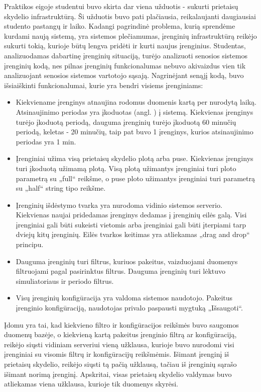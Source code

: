 \documentclass{VUMIFPSbakalaurinis}
\begin{document}
Praktikos eigoje studentui buvo skirta dar viena užduotis - sukurti prietaisų skydelio infrastruktūrą. Ši užduotis buvo pati plačiausia, reikalaujanti daugiausiai studento pastangų ir laiko. Kadangi pagrindinė problema, kurią sprendėme kurdami naują sistemą, yra sistemos plečiamumas, įrenginių infrastruktūrą reikėjo sukurti tokią, kurioje būtų lengva pridėti ir kurti naujus įrenginius. Studentas, analizuodamas dabartinę įrenginių situaciją, turėjo analizuoti senosios sistemos įrenginių kodą, nes pilnas įrenginių funkcionalumas nebuvo akivaizdus vien tik analizuojant senosios sistemos vartotojo sąsają. Nagrinėjant senąjį kodą, buvo išsiaiškinti funkcionalumai, kurie yra bendri visiems įrenginiams:
\begin{itemize}
    \item Kiekviename įrenginys atnaujina rodomus duomenis kartą per nurodytą laiką. Atsinaujinimo periodas yra įkoduotas (angl. ) į sistemą. Kiekvienas įrenginys turėjo įkoduotą periodą, dauguma įrenginių turėjo įkoduotą 60 minučių periodą, keletas - 20 minučių, taip pat buvo 1 įrenginys, kurios atsinaujinimo periodas yra 1 min.
    \item Įrenginiai užima visą prietaisų skydelio plotą arba puse. Kiekvienas įrenginys turi įkoduotą užimamą plotą. Visą plotą užimantys įrenginiai turi ploto parametrą su „full“ reikšme, o puse ploto užimantys įrenginiai turi parametrą su „half“ string tipo reikšme.
    \item Įrenginių išdėstymo tvarka yra nurodoma vidinio sistemos serverio. Kiekvienas naujai pridedamas įrenginys dedamas į įrenginių eilės galą. Visi įrenginiai gali būti sukeisti vietomis arba įrenginiai gali būti įterpiami tarp dviejų kitų įrenginių. Eilės tvarkos keitimas yra atliekamas „drag and drop“ principu.
    \item Dauguma įrenginių turi filtrus, kuriuos pakeitus, vaizduojami duomenys filtruojami pagal pasirinktus filtrus. Dauguma įrenginių turi lėktuvo simuliatoriaus ir periodo filtrus.
    \item Visų įrenginių konfigūracija yra valdoma sistemos naudotojo. Pakeitus įrenginio konfigūraciją, naudotojas privalo paspausti mygtuką „Išsaugoti“. 
\end{itemize}

Įdomu yra tai, kad kiekvieno filtro ir konfigūracijos reikšmės buvo saugomos duomenų bazėje, o kiekvieną kartą pakeitus įrenginio filtrą ar konfigūraciją, reikėjo siųsti vidiniam serveriui vieną užklausa, kurioje buvo nurodomi visi įrenginiai su visomis filtrų ir konfigūracijų reikšmėmis. Išimant įrenginį iš prietaisų skydelio, reikėjo siųsti tą pačią užklausą, tačiau iš įrenginių sąrašo išimant norimą įrenginį. Apskritai, visas prietaisų skydelio valdymas buvo atliekamas viena užklausa, kurioje tik duomenys skyrėsi.
\end{document}
